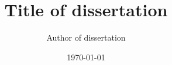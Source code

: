 \documentclass[12pt,report]{uncdissertation}
\title{}
\author{}
\date{}
\begin{document}
\title{Title of dissertation}
\author{Author of dissertation}
\date{\today}





\pagestyle{plain}

\frontmatter


\maketitlepg
\makecopyrightpage
\makeabstractpg
\makededicationpg




%

% 
\newlength{\oldbaselineskip}
\setlength{\oldbaselineskip}{\the\baselineskip}
\newlength{\oldparskip}
\setlength{\oldparskip}{\the\parskip}

\setlength{\baselineskip}{0.5\oldbaselineskip}
\setlength{\parskip}{0.5\oldbaselineskip}




\renewcommand{\contentsname}{TABLE OF CONTENTS}
\renewcommand{\cfttoctitlefont}{\textbf}
\renewcommand{\cftaftertoctitle}{\hfill}
\renewcommand{\cftdotsep}{1.5}
\cftsetrmarg{1.0in}
\end{document}

